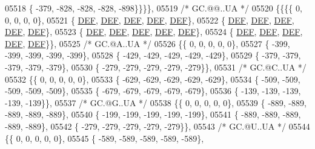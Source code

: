 \begin{DoxyCode}
05518 \{ -379, -828, -828, -828, -898\}\}\}\},
05519 \textcolor{comment}{/* GC.@@..UA */}
05520 \{\{\{\{    0,    0,    0,    0,    0\},
05521 \{  \mbox{\hyperlink{1_88_84__epars_8h_a397419fc12b37ed479c8abb9d444d843}{DEF}},  \mbox{\hyperlink{1_88_84__epars_8h_a397419fc12b37ed479c8abb9d444d843}{DEF}},  \mbox{\hyperlink{1_88_84__epars_8h_a397419fc12b37ed479c8abb9d444d843}{DEF}},  \mbox{\hyperlink{1_88_84__epars_8h_a397419fc12b37ed479c8abb9d444d843}{DEF}},  \mbox{\hyperlink{1_88_84__epars_8h_a397419fc12b37ed479c8abb9d444d843}{DEF}}\},
05522 \{  \mbox{\hyperlink{1_88_84__epars_8h_a397419fc12b37ed479c8abb9d444d843}{DEF}},  \mbox{\hyperlink{1_88_84__epars_8h_a397419fc12b37ed479c8abb9d444d843}{DEF}},  \mbox{\hyperlink{1_88_84__epars_8h_a397419fc12b37ed479c8abb9d444d843}{DEF}},  \mbox{\hyperlink{1_88_84__epars_8h_a397419fc12b37ed479c8abb9d444d843}{DEF}},  \mbox{\hyperlink{1_88_84__epars_8h_a397419fc12b37ed479c8abb9d444d843}{DEF}}\},
05523 \{  \mbox{\hyperlink{1_88_84__epars_8h_a397419fc12b37ed479c8abb9d444d843}{DEF}},  \mbox{\hyperlink{1_88_84__epars_8h_a397419fc12b37ed479c8abb9d444d843}{DEF}},  \mbox{\hyperlink{1_88_84__epars_8h_a397419fc12b37ed479c8abb9d444d843}{DEF}},  \mbox{\hyperlink{1_88_84__epars_8h_a397419fc12b37ed479c8abb9d444d843}{DEF}},  \mbox{\hyperlink{1_88_84__epars_8h_a397419fc12b37ed479c8abb9d444d843}{DEF}}\},
05524 \{  \mbox{\hyperlink{1_88_84__epars_8h_a397419fc12b37ed479c8abb9d444d843}{DEF}},  \mbox{\hyperlink{1_88_84__epars_8h_a397419fc12b37ed479c8abb9d444d843}{DEF}},  \mbox{\hyperlink{1_88_84__epars_8h_a397419fc12b37ed479c8abb9d444d843}{DEF}},  \mbox{\hyperlink{1_88_84__epars_8h_a397419fc12b37ed479c8abb9d444d843}{DEF}},  \mbox{\hyperlink{1_88_84__epars_8h_a397419fc12b37ed479c8abb9d444d843}{DEF}}\}\},
05525 \textcolor{comment}{/* GC.@A..UA */}
05526 \{\{    0,    0,    0,    0,    0\},
05527 \{ -399, -399, -399, -399, -399\},
05528 \{ -429, -429, -429, -429, -429\},
05529 \{ -379, -379, -379, -379, -379\},
05530 \{ -279, -279, -279, -279, -279\}\},
05531 \textcolor{comment}{/* GC.@C..UA */}
05532 \{\{    0,    0,    0,    0,    0\},
05533 \{ -629, -629, -629, -629, -629\},
05534 \{ -509, -509, -509, -509, -509\},
05535 \{ -679, -679, -679, -679, -679\},
05536 \{ -139, -139, -139, -139, -139\}\},
05537 \textcolor{comment}{/* GC.@G..UA */}
05538 \{\{    0,    0,    0,    0,    0\},
05539 \{ -889, -889, -889, -889, -889\},
05540 \{ -199, -199, -199, -199, -199\},
05541 \{ -889, -889, -889, -889, -889\},
05542 \{ -279, -279, -279, -279, -279\}\},
05543 \textcolor{comment}{/* GC.@U..UA */}
05544 \{\{    0,    0,    0,    0,    0\},
05545 \{ -589, -589, -589, -589, -589\},

\end{DoxyCode}
